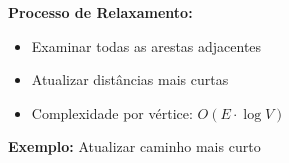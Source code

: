 \documentclass[preview]{standalone}
\begin{document}
\begin{center}
\textbf{Processo de Relaxamento:}
            \begin{itemize}
                \item Examinar todas as arestas adjacentes
                \item Atualizar distâncias mais curtas
                \item Complexidade por vértice: $O(E \cdot \log V)$
            \end{itemize}
            
            \textbf{Exemplo:} Atualizar caminho mais curto
\end{center}
\end{document}
